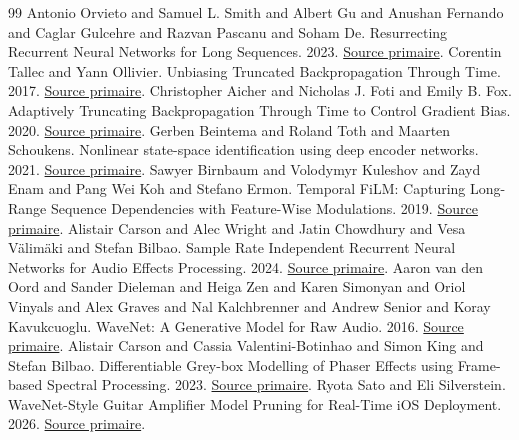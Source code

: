 \documentclass[10pt,a4paper]{article}
\begin{document}
\begin{thebibliography}{99}
Antonio Orvieto and Samuel L. Smith and Albert Gu and Anushan Fernando and Caglar Gulcehre and Razvan Pascanu and Soham De. Resurrecting Recurrent Neural Networks for Long Sequences. 2023. \href{https://arxiv.org/abs/2303.06349}{Source primaire}.
Corentin Tallec and Yann Ollivier. Unbiasing Truncated Backpropagation Through Time. 2017. \href{https://arxiv.org/abs/1705.08209}{Source primaire}.
Christopher Aicher and Nicholas J. Foti and Emily B. Fox. Adaptively Truncating Backpropagation Through Time to Control Gradient Bias. 2020. \href{https://proceedings.mlr.press/v115/aicher20a.html}{Source primaire}.
Gerben Beintema and Roland Toth and Maarten Schoukens. Nonlinear state-space identification using deep encoder networks. 2021. \href{https://proceedings.mlr.press/v144/beintema21a.html}{Source primaire}.
Sawyer Birnbaum and Volodymyr Kuleshov and Zayd Enam and Pang Wei Koh and Stefano Ermon. Temporal FiLM: Capturing Long-Range Sequence Dependencies with Feature-Wise Modulations. 2019. \href{https://arxiv.org/abs/1909.06628}{Source primaire}.
Alistair Carson and Alec Wright and Jatin Chowdhury and Vesa V\"{a}lim\"{a}ki and Stefan Bilbao. Sample Rate Independent Recurrent Neural Networks for Audio Effects Processing. 2024. \href{https://www.dafx.de/paper-archive/2024/papers/DAFx24_paper_68.pdf}{Source primaire}.
Aaron van den Oord and Sander Dieleman and Heiga Zen and Karen Simonyan and Oriol Vinyals and Alex Graves and Nal Kalchbrenner and Andrew Senior and Koray Kavukcuoglu. WaveNet: A Generative Model for Raw Audio. 2016. \href{https://arxiv.org/abs/1609.03499}{Source primaire}.
Alistair Carson and Cassia Valentini-Botinhao and Simon King and Stefan Bilbao. Differentiable Grey-box Modelling of Phaser Effects using Frame-based Spectral Processing. 2023. \href{https://arxiv.org/abs/2306.01332}{Source primaire}.
Ryota Sato and Eli Silverstein. WaveNet-Style Guitar Amplifier Model Pruning for Real-Time iOS Deployment. 2026. \href{https://arxiv.org/abs/2607.10086}{Source primaire}.
\end{thebibliography}
\end{document}
